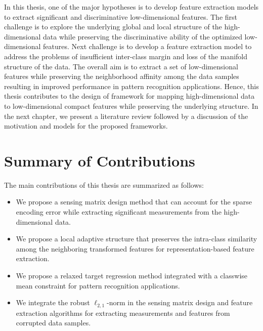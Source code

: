 In this thesis, one of the major hypotheses is to develop feature extraction models to extract significant and discriminative low-dimensional features. The first challenge is to explore the underlying global and local structure of the high-dimensional data while preserving the discriminative ability of the optimized low-dimensional features. Next challenge is to develop a feature extraction model to address the problems of insufficient inter-class margin and loss of the manifold structure of the data. The overall aim is to extract a set of low-dimensional features while preserving the neighborhood affinity among the data samples resulting in improved performance in pattern recognition applications. Hence, this thesis contributes to the design of framework for mapping high-dimensional data to low-dimensional compact features while preserving the underlying structure. In the next chapter, we present a literature review followed by a discussion of the motivation and models for the proposed frameworks.
\section{Summary of Contributions}
\label{sec: Chap1_contri}
The main contributions of this thesis are summarized as follows:

\begin{itemize}
    \item We propose a sensing matrix design method that can account for the sparse encoding error while extracting significant measurements from the high-dimensional data.
    \item We propose a local adaptive structure that preserves the intra-class similarity among the neighboring transformed features for representation-based feature extraction.
    \item We propose a relaxed target regression method integrated with a classwise mean constraint for pattern recognition applications.
    \item We integrate the robust $\ell_{2,1}$-norm in the sensing matrix design and feature extraction algorithms for extracting measurements and features from corrupted data samples.
\end{itemize}
